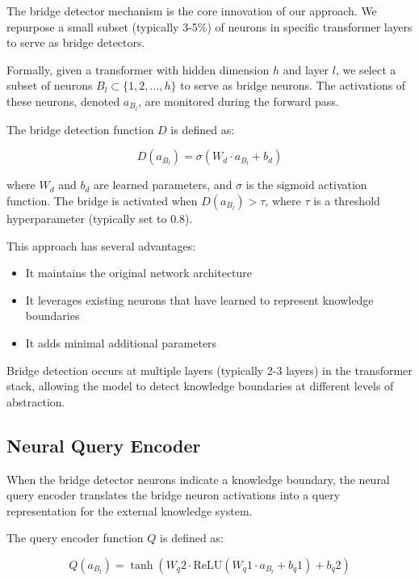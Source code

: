 \documentclass[9pt,a4paper,twocolumn,twoside]{tau-class/tau}
\begin{document}
    The bridge detector mechanism is the core innovation of our approach. We repurpose a small subset (typically 3-5\%) of neurons in specific transformer layers to serve as bridge detectors.

    Formally, given a transformer with hidden dimension $h$ and layer $l$, we select a subset of neurons $B_l \subset \{1, 2, ..., h\}$ to serve as bridge neurons. The activations of these neurons, denoted $a_{B_l}$, are monitored during the forward pass.

    The bridge detection function $D$ is defined as:

    \begin{equation}
    D(a_{B_l}) = \sigma(W_d \cdot a_{B_l} + b_d)
    \end{equation}

    where $W_d$ and $b_d$ are learned parameters, and $\sigma$ is the sigmoid activation function. The bridge is activated when $D(a_{B_l}) > \tau$, where $\tau$ is a threshold hyperparameter (typically set to 0.8).

    This approach has several advantages:
    \begin{itemize}
        \item It maintains the original network architecture
        \item It leverages existing neurons that have learned to represent knowledge boundaries
        \item It adds minimal additional parameters
    \end{itemize}

    Bridge detection occurs at multiple layers (typically 2-3 layers) in the transformer stack, allowing the model to detect knowledge boundaries at different levels of abstraction.

\subsection{Neural Query Encoder}

    When the bridge detector neurons indicate a knowledge boundary, the neural query encoder translates the bridge neuron activations into a query representation for the external knowledge system.

    The query encoder function $Q$ is defined as:

    \begin{equation}
    Q(a_{B_l}) = \tanh(W_q2 \cdot \text{ReLU}(W_q1 \cdot a_{B_l} + b_q1) + b_q2)
    \end{equation}
\end{document}
